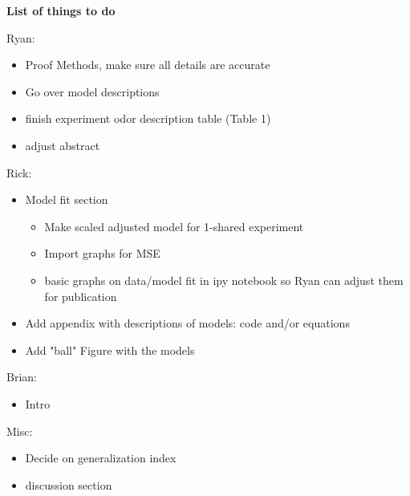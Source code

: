 \textbf{List of things to do}

Ryan:
\begin{itemize}
\item Proof Methods, make sure all details are accurate
\item Go over model descriptions
\item finish experiment odor description table (Table 1)
\item adjust abstract
\end{itemize}
Rick:
\begin{itemize}
\item Model fit section
\begin{itemize}
\item Make scaled adjusted model for 1-shared experiment
\item Import graphs for MSE
\item basic graphs on data/model fit in ipy notebook so Ryan can adjust them for publication
\end{itemize}
\item Add appendix with descriptions of models: code and/or equations
\item Add "ball" Figure with the models
\end{itemize}

Brian:
\begin{itemize}
\item Intro
\end{itemize}

Misc:
\begin{itemize}
\item Decide on generalization index
\item discussion section
\end{itemize}
